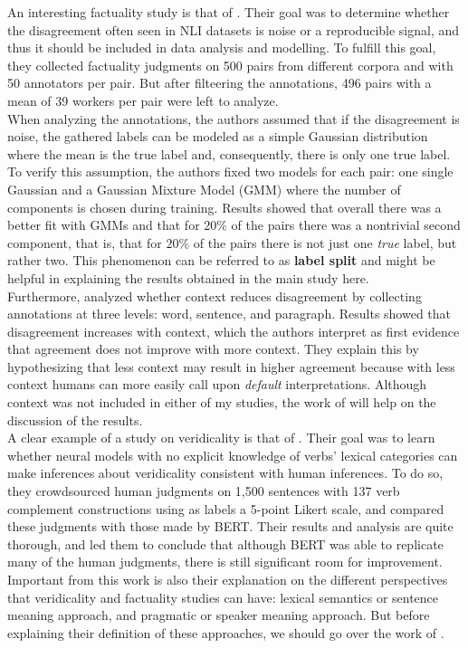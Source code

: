 An interesting factuality study is that of \citet{pavlick2019inherent}. Their goal was to determine whether the disagreement often seen in NLI datasets is noise or a reproducible signal, and thus it should be included in data analysis and modelling. To fulfill this goal, they collected factuality judgments on 500 pairs from different corpora and with 50 annotators per pair. But after filteering the annotations, 496 pairs with a mean of 39 workers per pair were left to analyze.\\

When analyzing the annotations, the authors assumed that if the disagreement is noise, the gathered labels can be modeled as a simple Gaussian distribution where the mean is the true label and, consequently, there is only one true label. To verify this assumption, the authors fixed two models for each pair: one single Gaussian and a Gaussian Mixture Model (GMM) where the number of components is chosen during training. Results showed that overall there was a better fit with GMMs and that for $20\%$ of the pairs there was a nontrivial second component, that is, that for $20\%$ of the pairs there is not just one \textit{true} label, but rather two. This phenomenon can be referred to as \textbf{label split} \citep{de2012did} and might be helpful in explaining the results obtained in the main study here.\\

Furthermore, \citet{pavlick2019inherent} analyzed whether context reduces disagreement by collecting annotations at three levels: word, sentence, and paragraph. Results showed that disagreement increases with context, which the authors interpret as first evidence that agreement does not improve with more context. They explain this by hypothesizing that less context may result in higher agreement because with less context humans can more easily call upon \textit{default} interpretations. Although context was not included in either of my studies, the work of \citet{pavlick2019inherent} will help on the discussion of the results.\\

A clear example of a study on veridicality is that of \citet{ross2019well}. Their goal was to learn whether neural models with no explicit knowledge of verbs' lexical categories can make inferences about veridicality consistent with human inferences. To do so, they crowdsourced human judgments on 1,500 sentences with 137 verb complement constructions using as labels a 5-point Likert scale, and compared these judgments with those made by BERT. Their results and analysis are quite thorough, and led them to conclude that although BERT was able to replicate many of the human judgments, there is still significant room for improvement. Important from this work is also their explanation on the different perspectives that veridicality and factuality studies can have: lexical semantics or sentence meaning approach, and pragmatic or speaker meaning approach. But before explaining their definition of these approaches, we should go over the work of \citet{de2012did}.\\

